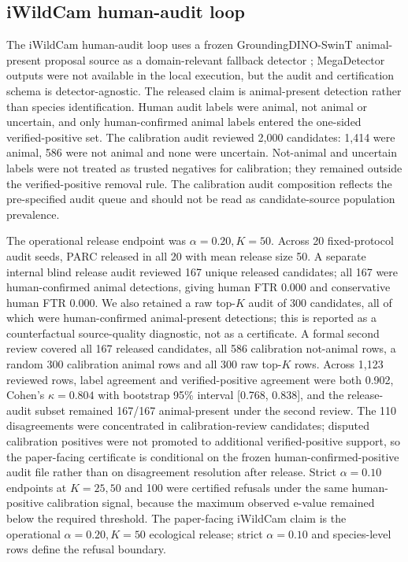 \documentclass[10pt,twocolumn]{article}
\begin{document}
\subsection{iWildCam human-audit loop}

The iWildCam human-audit loop uses a frozen GroundingDINO-SwinT animal-present proposal source as a domain-relevant fallback detector \cite{liu2024grounding}; MegaDetector outputs were not available in the local execution, but the audit and certification schema is detector-agnostic.
The released claim is animal-present detection rather than species identification.
Human audit labels were animal, not animal or uncertain, and only human-confirmed animal labels entered the one-sided verified-positive set.
The calibration audit reviewed 2,000 candidates: 1,414 were animal, 586 were not animal and none were uncertain.
Not-animal and uncertain labels were not treated as trusted negatives for calibration; they remained outside the verified-positive removal rule.
The calibration audit composition reflects the pre-specified audit queue and should not be read as candidate-source population prevalence.

The operational release endpoint was \(\alpha=0.20,K=50\).
Across 20 fixed-protocol audit seeds, PARC released in all 20 with mean release size 50.
A separate internal blind release audit reviewed 167 unique released candidates; all 167 were human-confirmed animal detections, giving human FTR 0.000 and conservative human FTR 0.000.
We also retained a raw top-\(K\) audit of 300 candidates, all of which were human-confirmed animal-present detections; this is reported as a counterfactual source-quality diagnostic, not as a certificate.
A formal second review covered all 167 released candidates, all 586 calibration not-animal rows, a random 300 calibration animal rows and all 300 raw top-\(K\) rows.
Across 1,123 reviewed rows, label agreement and verified-positive agreement were both 0.902, Cohen's \(\kappa=0.804\) with bootstrap 95\% interval [0.768, 0.838], and the release-audit subset remained 167/167 animal-present under the second review.
The 110 disagreements were concentrated in calibration-review candidates; disputed calibration positives were not promoted to additional verified-positive support, so the paper-facing certificate is conditional on the frozen human-confirmed-positive audit file rather than on disagreement resolution after release.
Strict \(\alpha=0.10\) endpoints at \(K=25,50\) and 100 were certified refusals under the same human-positive calibration signal, because the maximum observed e-value remained below the required threshold.
The paper-facing iWildCam claim is the operational \(\alpha=0.20,K=50\) ecological release; strict \(\alpha=0.10\) and species-level rows define the refusal boundary.
\end{document}

